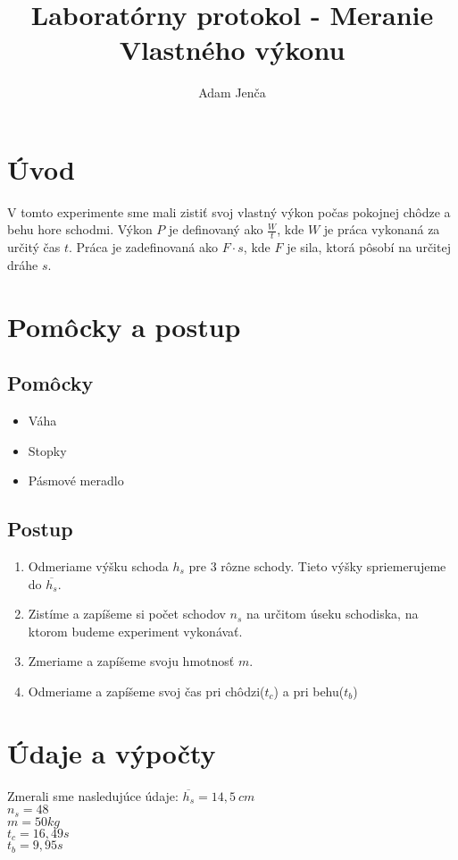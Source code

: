 \documentclass{article}
\begin{document}
\title {\textbf{Laboratórny protokol - Meranie Vlastného výkonu}}
\author{Adam Jenča}
\setlength{\tabcolsep}{18pt}
\renewcommand{\arraystretch}{1.5}
\maketitle
\newpage
\section{Úvod}
V tomto experimente sme mali zistiť svoj vlastný výkon počas pokojnej chôdze a behu hore schodmi.
Výkon $P$ je definovaný ako $\frac{W}{t}$, kde $W$ je práca vykonaná za určitý čas $t$.
Práca je zadefinovaná ako $F\cdot s$, kde $F$ je sila, ktorá pôsobí na určitej dráhe $s$.
\section{Pomôcky a postup}
\subsection{Pomôcky}
\begin{itemize}
	\item Váha
	\item Stopky
	\item Pásmové meradlo
\end{itemize}
\subsection{Postup}
\begin{enumerate}
	\item Odmeriame výšku schoda $h_s$ pre 3 rôzne schody. Tieto výšky spriemerujeme do $\overline{h_s}$.
	\item Zistíme a zapíšeme si počet schodov $n_s$ na určitom úseku schodiska, na ktorom budeme experiment vykonávať.
	\item Zmeriame a zapíšeme svoju hmotnosť $m$.
	\item Odmeriame a zapíšeme svoj čas pri chôdzi($t_c$) a pri behu($t_b$)
\end{enumerate}
\section{Údaje a výpočty}
Zmerali sme nasledujúce údaje:
$\overline{h_s}=14,5\ cm$\\
$n_s=48$\\
$m=50 kg$\\
$t_c=16,49s$\\
$t_b=9,95s$\\
\end{document}

